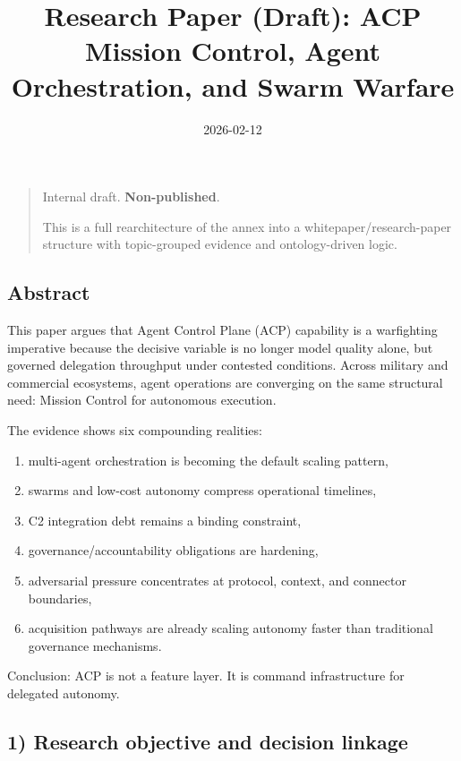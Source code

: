 \documentclass[
]{article}
\title{Research Paper (Draft): ACP Mission Control, Agent Orchestration,
and Swarm Warfare}
\author{}
\date{2026-02-12}
\providecommand{\tightlist}{%
  \setlength{\itemsep}{0pt}\setlength{\parskip}{0pt}}
\begin{document}
\maketitle

\begin{quote}
Internal draft. \textbf{Non-published}.

This is a full rearchitecture of the annex into a
whitepaper/research-paper structure with topic-grouped evidence and
ontology-driven logic.
\end{quote}

\hypertarget{abstract}{%
\subsection{Abstract}\label{abstract}}

This paper argues that Agent Control Plane (ACP) capability is a
warfighting imperative because the decisive variable is no longer model
quality alone, but governed delegation throughput under contested
conditions. Across military and commercial ecosystems, agent operations
are converging on the same structural need: Mission Control for
autonomous execution.

The evidence shows six compounding realities:

\begin{enumerate}
\def\labelenumi{\arabic{enumi}.}
\tightlist
\item
  multi-agent orchestration is becoming the default scaling pattern,
\item
  swarms and low-cost autonomy compress operational timelines,
\item
  C2 integration debt remains a binding constraint,
\item
  governance/accountability obligations are hardening,
\item
  adversarial pressure concentrates at protocol, context, and connector
  boundaries,
\item
  acquisition pathways are already scaling autonomy faster than
  traditional governance mechanisms.
\end{enumerate}

Conclusion: ACP is not a feature layer. It is command infrastructure for
delegated autonomy.

\hypertarget{research-objective-and-decision-linkage}{%
\subsection{1) Research objective and decision
linkage}\label{research-objective-and-decision-linkage}}
\end{document}
